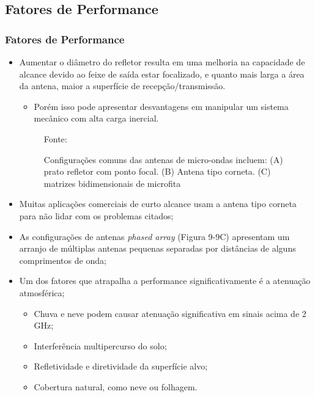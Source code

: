 \documentclass[xcolor=dvipsnames, aspectratio=169]{beamer}
\begin{document}
    \subsection[Fatores de Performance]{Fatores de Performance} 
    \begin{frame}
    \frametitle{Fatores de Performance}
        \begin{itemize}
            \item Aumentar o diâmetro do refletor resulta em uma melhoria na capacidade de alcance devido ao feixe de saída estar focalizado, e quanto mais larga a área da antena, maior a superfície de recepção/transmissão.
            \begin{itemize}
                \item Porém isso pode apresentar desvantagens em manipular um sistema mecânico com alta carga inercial.
            \end{itemize}
            		
		\begin{figure}
            \centering
            {Fonte: \cite{everett1995sensors}}
            \caption{Configurações comuns das antenas de micro-ondas incluem: (A) prato refletor com ponto focal. (B) Antena tipo corneta. (C) matrizes bidimensionais de microfita}
            \label{fig:curva_de_freq}
        \end{figure}
        
            \item Muitas aplicações comerciais de curto alcance usam a antena tipo corneta para não lidar com os problemas citados;
            \item As configurações de antenas \textit{phased array} (Figura 9-9C) apresentam um arranjo de múltiplas antenas pequenas separadas por distâncias de alguns comprimentos de onda;
            \item Um dos fatores que atrapalha a performance significativamente é a atenuação atmosférica;
            \begin{itemize}
                \item Chuva e neve podem causar atenuação significativa em sinais acima de 2 GHz;
                \item Interferência multipercurso do solo; 
                \item Refletividade e diretividade da superfície alvo;
                \item Cobertura natural, como neve ou folhagem.
            \end{itemize}
        \end{itemize}
    \end{frame}
\end{document}
